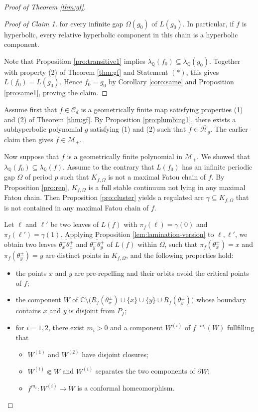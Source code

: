 \documentclass[a4paper,reqno,times, 11pt]{amsart}
\theoremstyle{remark}
\theoremstyle{plain}
\numberwithin{equation}{section}
\def\MMMM{{\cal M}}
\def\MMMM{\mathscr M}
\def\HHHH{\mathscr H}
\def\CCCC{\mathscr C}
\def\g{\gamma}
\def\C{\mbox{$\mathbb C$}}
\def\Q{\mathbb Q}
\def\cal{\mathcal}
\begin{document}
\begin{proof}[Proof of Theorem \ref{thm:gf}]
\begin{proof}[Proof of Claim 1]
		\noindent for every infinite gap $\Omega(g_0)$ of $L(g_0)$. In particular, if $f$ is hyperbolic, every relative hyperbolic component in this chain is a hyperbolic component.
		
		Note that Proposition \ref{pro:transitive1} implies $\lambda_\Q(f_0)\subseteq \lambda_\Q(g_0)$. Together with property (2) of Theorem \ref{thm:gf} and Statement $(\ast)$, this gives $L(f_0)=L(g_0)$. Hence $f_0=g_0$ by Corollary \ref{coro:same} and Proposition \ref{pro:same1}, proving the claim.
	\end{proof}
	
	
	Assume first that $f\in\CCCC_d$ is a geometrically finite map satisfying properties (1) and (2) of Theorem \ref{thm:gf}. By Proposition \ref{pro:plumbing1}, there exists a subhyperbolic polynomial $g$ satisfying (1) and (2) such that  $f\in\overline{\HHHH_g}$. The earlier claim then gives $f\in\MMMM_+$.
	
	Now suppose that $f$ is a geometrically finite polynomial in $\MMMM_+$. We showed that $\lambda_\Q(f_0)\subseteq\lambda_\Q(f)$.
	Assume to the contrary that $L(f_0)$ has an infinite periodic gap $\Omega$ of period $p$ such that $K_{f,\Omega}$ is not a maximal Fatou chain of $f$. By Proposition \ref{pro:ren}, $K_{f,\Omega}$ is a full stable continuum not lying in any maximal Fatou chain. Then Proposition \ref{pro:cluster} yields a regulated arc $\gamma \subseteq K_{f,\Omega}$ that is not contained in any maximal Fatou chain of $f$.
	
	
	
Let $\ell$ and $\ell'$ be two leaves of $L(f)$ with $\pi_f(\ell)=\g(0)$ and $\pi_f(\ell')=\g(1)$. 	
	Applying Proposition \ref{lem:lamination-version} to $\ell,\ell'$, we obtain two leaves $\overline{\theta^-_x\theta_x^+}$ and $\overline{\theta_y^-\theta_y^+}$ of $L(f)$ within $\Omega$, such that  $\pi_f(\theta^\pm_x)=x$ and $\pi_f(\theta^\pm_y)=y$ are distinct points in $K_{f,\Omega}$, and the following properties hold:
	\begin{itemize}
		\item [(a)] the points $x$ and $y$ are pre-repelling and their orbits avoid the critical points of $f$;
		\item [(b)] the component $W$ of $\C\setminus\big(R_{f}(\theta_x^\pm)\cup\{x\}\cup\{y\}\cup R_{f}(\theta_y^\pm)\big)$ whose boundary contains $x$ and $y$
		is disjoint from $P_f$;
		\item [(c)] for $i=1,2$, there exist $m_i>0$ and a component $W^{(i)}$ of $f^{-m_i}(W)$ fullfilling that
		\begin{itemize}
			\item[-]  $W^{(1)}$ and $W^{(2)}$ have disjoint closures;
			\item[-] $W^{(i)}\Subset W$ and $W^{(i)}$ separates the two components of $\partial W$;
			\item[-] $f^{m_i}:W^{(i)}\to W$ is a conformal homeomorphism.
		\end{itemize}
	\end{itemize}
	

\end{proof}
\end{document}
